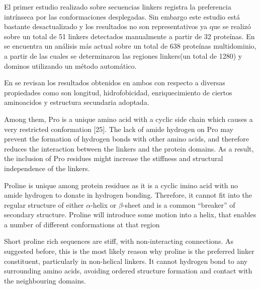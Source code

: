 El primer estudio realizado sobre secuencias linkers \cite{argos1990investigation} registra la preferencia intrínseca por las conformaciones desplegadas.   
Sin embargo este estudio está bastante desactualizado y los resultados no son representativos ya que se realizó sobre un total de 51 linkers detectados manualmente a partir de 32 proteínas.
En \cite{george2002analysis} se encuentra un análisis más actual sobre un total de 638 proteínas multidominio,  a partir de las cuales se determinaron las regiones linkers(un total de 1280) y dominos utilizando un método automático.


En \cite{chen2013fusion} se revisan los resultados obtenidos en ambos con respecto a diversas propiedades como son longitud, hidrofobicidad, enriquecimiento de ciertos aminoacidos y estructura secundaria adoptada.




Among them, Pro is a unique amino acid with a cyclic side chain which causes a very
restricted conformation [25]. The lack of amide hydrogen on Pro may prevent the formation
of hydrogen bonds with other amino acids, and therefore reduces the interaction between the
linkers and the protein domains.
As a result, the inclusion of Pro residues might increase the
stiffness and structural independence of the linkers.

Proline is unique among protein residues as
it is a cyclic imino acid with no amide hydrogen to donate in
hydrogen bonding. Therefore, it cannot fit into the regular
structure of either $\alpha$-helix or $\beta$-sheet and is a common ``breaker''
of secondary structure.
Proline will introduce some motion into a
helix, that enables a number of different conformations at that
region

Short proline rich sequences are
stiff, with non-interacting connections. As suggested before,
this is the most likely reason why proline is the preferred
linker constituent, particularly in non-helical linkers. It cannot
hydrogen bond to any surrounding amino acids, avoiding
ordered structure formation and contact with the neighbouring
domains.




